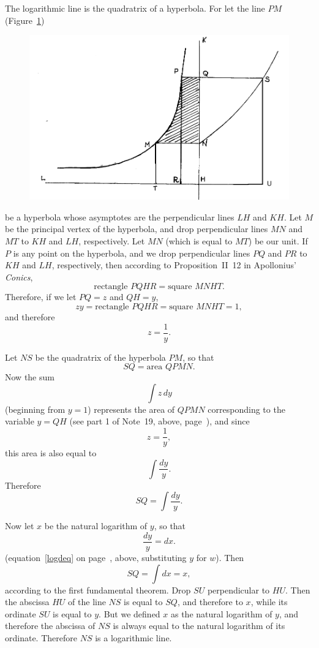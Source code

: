 \documentclass[twoside,openright]{article}
\begin{document}
\setcounter{equation}{0}

\label{begloghyp} 

The logarithmic line is the quadratrix of a hyperbola.  For let the line $PM$ (Figure~\ref{hypquad})
\begin{figure}[htp]
\begin{center}
\includegraphics[width=\textwidth]{fig/Figure52}
\caption{}
\label{hypquad}
\vspace{-10pt}
\end{center}
\end{figure} 
 be a hyperbola whose asymptotes are the perpendicular lines $LH$ and $KH$.  Let $M$ be the principal vertex of the hyperbola, and drop perpendicular lines $MN$ and $MT$ to $KH$ and $LH$, respectively.  Let $MN$ (which is equal to $MT$) be our unit.  If $P$ is any point on the hyperbola, and we drop perpendicular lines $PQ$ and $PR$ to $KH$ and $LH$, respectively,  then according to Proposition~II~12 in Apollonius' {\em Conics}, 
$$\mbox{rectangle }PQHR = \mbox{square }MNHT.$$
Therefore, if we let $PQ=z$ and $QH=y$, 
$$zy = \mbox{rectangle }PQHR = \mbox{square }MNHT = 1,$$
and therefore
$$z = \frac{1}{y}.$$


Let $NS$ be the quadratrix of the hyperbola $PM$, so that 
$$SQ = \mbox{area }QPMN.$$
Now the sum
$$\int\! z\,dy$$
(beginning from $y=1$) represents the area of $QPMN$ corresponding to the variable $y = QH$  (see part 1 of Note~19, above, page~\pageref{meas}), and since 
$$z = \frac{1}{y},$$
this area is also equal to
$$\int\! \frac{dy}{y}.$$
Therefore 
$$SQ = \int\! \frac{dy}{y}.$$


Now let $x$ be the natural logarithm of $y$, so that 
$$\frac{dy}{y} = dx.$$
(equation~\ref{logdeq} on page~\pageref{logdeq}, above, substituting $y$ for $w$). Then
$$SQ= \int\! dx = x,$$
according to the first fundamental theorem.  Drop $SU$ perpendicular
to $HU$.  Then the abscissa $HU$ of the line $NS$ is equal to $SQ$,
and therefore to $x$, while its ordinate $SU$ is equal to $y$.  But we
defined $x$ as the natural logarithm of $y$, and therefore the
abscissa of $NS$ is always equal to the natural logarithm of its
ordinate.  Therefore $NS$ is a logarithmic line.
\label{endloghyp}
  
\end{document}

